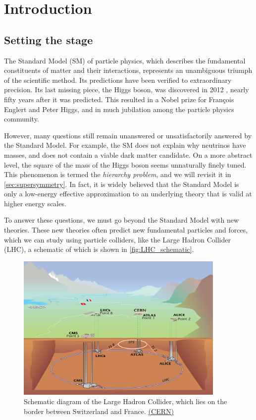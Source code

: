 \chapter{Introduction}\label{ch:introduction}
\section{Setting the stage}
The Standard Model (SM) of particle physics, which describes the fundamental constituents of matter and their interactions, represents an unambiguous triumph of the scientific method. Its predictions have been verified to extraordinary precision. Its last missing piece, the Higgs boson, was discovered in 2012 \cite{Aad:2012tfa,Chatrchyan:2012xdj}, nearly fifty years after it was predicted. This resulted in a Nobel prize for François Englert and Peter Higgs, and in much jubilation among the particle physics community. 

However, many questions still remain unanswered or unsatisfactorily answered by the Standard Model. For example, the SM  does not explain why neutrinos have masses, and does not contain a viable dark matter candidate. On a more abstract level, the square of the mass of the Higgs boson seems unnaturally finely tuned. This phenomenon is termed the \emph{hierarchy problem}, and we will revisit it in \autoref{sec:supersymmetry}. In fact, it is widely believed that the Standard Model is only a low-energy effective approximation to an underlying theory that is valid at higher energy scales.

To answer these questions, we must go beyond the Standard Model with new theories. These new theories often predict new fundamental particles and forces, which we can study using particle colliders, like the Large Hadron Collider (LHC), a schematic of which is shown in \autoref{fig:LHC_schematic}.

\begin{figure}
  \centering
  \includegraphics[width=0.9\textwidth]{images/LHC}
  \caption{Schematic diagram of the Large Hadron Collider, which lies on the border between Switzerland and France. \href{http://cds.cern.ch/journal/CERNBulletin/2008/38/News\%20Articles/1125888?ln=en}{(CERN)}}
  \label{fig:LHC_schematic}
\end{figure}

